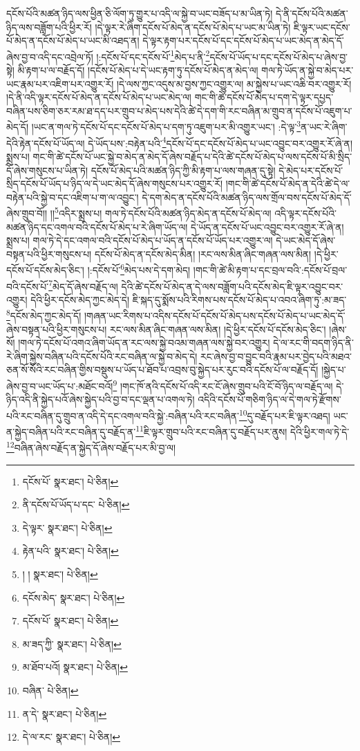 དངོས་པོའི་མཚན་ཉིད་ལས་ཕྱིན་ཅི་ལོག་ཏུ་གྱུར་པ་འདི་ལ་སྐྱེ་བ་ཡང་བཟོད་པ་མ་ཡིན་ཏེ། དེ་ནི་དངོས་པོའི་མཚན་ཉིད་ལས་བཟློག་པའི་ཕྱིར་རོ། །དེ་ལྟར་རེ་ཞིག་དངོས་པོ་མེད་ན་དངོས་པོ་མེད་པ་ཡང་མ་ཡིན་ཏེ། ཇི་ལྟར་ཡང་དངོས་པོ་མེད་ན་དངོས་པོ་མེད་པ་ཡང་མི་འཐད་ན། དེ་ལྟར་རྟག་པར་དངོས་པོ་དང་དངོས་པོ་མེད་པ་ཡང་མེད་ན་མེད་དོ་ཞེས་བྱ་བ་འདི་དང་འབྲེལ་ཏོ། །:དངོས་པོ་དང་དངོས་པོ་\footnote{དངོས་པོ་  སྣར་ཐང་།  པེ་ཅིན། }མེད་པ་ནི་\footnote{ནི་དངོས་པོ་ཡོད་པ་དང་  པེ་ཅིན། }དངོས་པོ་ཡོད་པ་དང་དངོས་པོ་མེད་པ་ཞེས་བྱ་སྟེ། མི་རྟག་པ་ལ་བརྗོད་དོ། །དངོས་པོ་མེད་པ་དེ་ཡང་རྟག་ཏུ་དངོས་པོ་མེད་ན་མེད་ལ། གལ་ཏེ་ཡོད་ན་སྐྱེ་བ་མེད་པར་ཡང་རྣམ་པར་འཇིག་པར་འགྱུར་རོ། །དེ་ལས་ཀྱང་འདུས་མ་བྱས་ཀྱང་འགྱུར་ལ། མ་སྐྱེས་པ་ཡང་འཆི་བར་འགྱུར་རོ། །དེ་ནི་འདི་ལྟར་དངོས་པོ་མེད་ན་དངོས་པོ་མེད་པ་ཡང་མེད་ལ། གང་གི་ཚེ་དངོས་པོ་མེད་པ་དག་དེ་ལྟར་དཔྱད་བཞིན་པས་ཅིག་ཅར་རམ་ཐ་དད་པར་གྲུབ་པ་མེད་པས་དེའི་ཚེ་དེ་དག་གི་རང་བཞིན་མ་གྲུབ་ན་དངོས་པོ་འཇུག་པ་མེད་དོ། །ཡང་ན་གལ་ཏེ་དངོས་པོ་དང་དངོས་པོ་མེད་པ་དག་ཏུ་འཇུག་པར་མི་འགྱུར་ཡང་། :དེ་ལྟ་\footnote{དེ་ལྟར་  སྣར་ཐང་།  པེ་ཅིན། }ན་ཡང་རེ་ཞིག་དེའི་རྟེན་དངོས་པོ་ཡོད་ལ། དེ་ཡོད་པས་:བརྟེན་པའི་\footnote{རྟེན་པའི་  སྣར་ཐང་།  པེ་ཅིན། }དངོས་པོ་དང་དངོས་པོ་མེད་པ་ཡང་འབྱུང་བར་འགྱུར་རོ་ཞེ་ན། སྨྲས་པ། གང་གི་ཚེ་དངོས་པོ་ཡང་སྐྱེ་བ་མེད་ན་མེད་དོ་ཞེས་བརྗོད་པ་དེའི་ཚེ་དངོས་པོ་མེད་པ་ལས་དངོས་པོ་མི་སྲིད་དོ་ཞེས་གསུངས་པ་ཡིན་ཏེ། དངོས་པོ་མེད་པའི་མཚན་ཉིད་ཀྱི་མི་རྟག་པ་ལས་གཞན་དུ་སྟེ། དེ་མེད་པར་དངོས་པོ་སྲིད་དངོས་པོ་ཡོད་པ་ཉིད་ལ་དེ་ཡང་མེད་དོ་ཞེས་གསུངས་པར་འགྱུར་རོ། །གང་གི་ཚེ་དངོས་པོ་མེད་ན་དེའི་ཚེ་དེ་ལ་བརྟེན་པའི་སྐྱེ་བ་དང་འཇིག་པ་ག་ལ་འབྱུང་། དེ་དག་མེད་ན་དངོས་པོའི་མཚན་ཉིད་ལས་གྲོལ་བས་དངོས་པོ་མེད་དོ་ཞེས་གྲུབ་བོ།། །།\footnote{། །  སྣར་ཐང་།  པེ་ཅིན། }འདིར་སྨྲས་པ། གལ་ཏེ་དངོས་པོའི་མཚན་ཉིད་མེད་ན་དངོས་པོ་མེད་ལ། འདི་ལྟར་དངོས་པོའི་མཚན་ཉིད་དང་འགལ་བའི་དངོས་པོ་མེད་པ་རེ་ཞིག་ཡོད་ལ། དེ་ཡོད་ན་དངོས་པོ་ཡང་འབྱུང་བར་འགྱུར་རོ་ཞེ་ན། སྨྲས་པ། གལ་ཏེ་དེ་དང་འགལ་བའི་དངོས་པོ་མེད་པ་ཡོད་ན་དངོས་པོ་ཡོད་པར་འགྱུར་ལ། དེ་ཡང་མེད་དོ་ཞེས་བསྟན་པའི་ཕྱིར་གསུངས་པ། དངོས་པོ་མེད་ན་དངོས་མེད་མིན། །རང་ལས་མིན་ཞིང་གཞན་ལས་མིན། །དེ་ཕྱིར་དངོས་པོ་དངོས་མེད་ཅིང་། །:དངོས་པོ་\footnote{དངོས་མེད་  སྣར་ཐང་།  པེ་ཅིན། }མེད་པས་དེ་དག་མེད། །གང་གི་ཚེ་མི་རྟག་པ་དང་བྲལ་བའི་:དངོས་པོ་བྲལ་བའི་དངོས་པོ་\footnote{དངོས་པོ་  སྣར་ཐང་།  པེ་ཅིན། }མེད་དོ་ཞེས་བརྗོད་ལ། དེའི་ཚེ་དངོས་པོ་མེད་ན་དེ་ལས་བཟློག་པའི་དངོས་མེད་ཇི་ལྟར་འབྱུང་བར་འགྱུར། དེའི་ཕྱིར་དངོས་མེད་ཀྱང་མེད་དེ། ཇི་སྐད་དུ་སྨོས་པའི་རིགས་པས་དངོས་པོ་མེད་པ་འབའ་ཞིག་ཏུ་:མ་ཟད་\footnote{མ་ཟད་ཀྱི་  སྣར་ཐང་།  པེ་ཅིན། }དངོས་མེད་ཀྱང་མེད་དོ། །གཞན་ཡང་རིགས་པ་འདིས་དངོས་པོ་དངོས་པོ་མེད་པས་དངོས་པོ་མེད་པ་ཡང་མེད་དོ་ཞེས་བསྟན་པའི་ཕྱིར་གསུངས་པ། རང་ལས་མིན་ཞིང་གཞན་ལས་མིན། །དེ་ཕྱིར་དངོས་པོ་དངོས་མེད་ཅིང་། །ཞེས་སོ། །གལ་ཏེ་དངོས་པོ་འགའ་ཞིག་ཡོད་ན་རང་ལས་སྐྱེ་བའམ་གཞན་ལས་སྐྱེ་བར་འགྱུར། དེ་ལ་རང་གི་བདག་ཉིད་ནི་རེ་ཞིག་སྐྱེས་བཞིན་པའི་དངོས་པོའི་རང་བཞིན་ལ་སྐྱེ་བ་མེད་དེ། རང་ཞེས་བྱ་བ་བྱུང་བའི་རྣམ་པར་བྱེད་པའི་མཐའ་ཅན་སོ་སོའི་རང་བཞིན་གྱིས་བསྡུས་པ་ཡོད་པ་ཐོབ་པ་འབྲས་བུ་སྐྱེད་པར་རུང་བའི་དངོས་པོ་ལ་བརྗོད་དོ། །སྐྱེད་པ་ཞེས་བྱ་བ་ཡང་ཡོད་པ་:མཐོང་བའོ།\footnote{མ་ཐོབ་པའོ།  སྣར་ཐང་།  པེ་ཅིན། } །གང་ཁོ་ནའི་དངོས་པོ་འདི་རང་ངོ་ཞེས་གྲུབ་པའི་ངོ་བོ་ཉིད་ལ་བརྗོད་ལ། དེ་ཉིད་འདི་ནི་སྐྱེད་པའོ་ཞེས་སྐྱེད་པའི་བྱ་བ་དང་ལྡན་པ་འགལ་ཏེ། འདིའི་དངོས་པོ་གཅིག་ཉིད་ལ་དེ་གལ་ཏེ་རྫོགས་པའི་རང་བཞིན་དུ་གྲུབ་ན་འདི་དེ་དང་འགལ་བའི་སྐྱེ་:བཞིན་པའི་རང་བཞིན་\footnote{བཞིན་  པེ་ཅིན། }དུ་བརྗོད་པར་ཇི་ལྟར་འཐད། ཡང་ན་སྐྱེད་བཞིན་པའི་རང་བཞིན་དུ་བརྗོད་ན་\footnote{ན་དེ་  སྣར་ཐང་།  པེ་ཅིན། }ཇི་ལྟར་གྲུབ་པའི་རང་བཞིན་དུ་བརྗོད་པར་ནུས། དེའི་ཕྱིར་གལ་ཏེ་དེ་\footnote{དེ་ལ་རང་  སྣར་ཐང་།  པེ་ཅིན། }བཞིན་ཞེས་བརྗོད་ན་སྐྱེད་དོ་ཞེས་བརྗོད་པར་མི་བྱ་ལ། 
